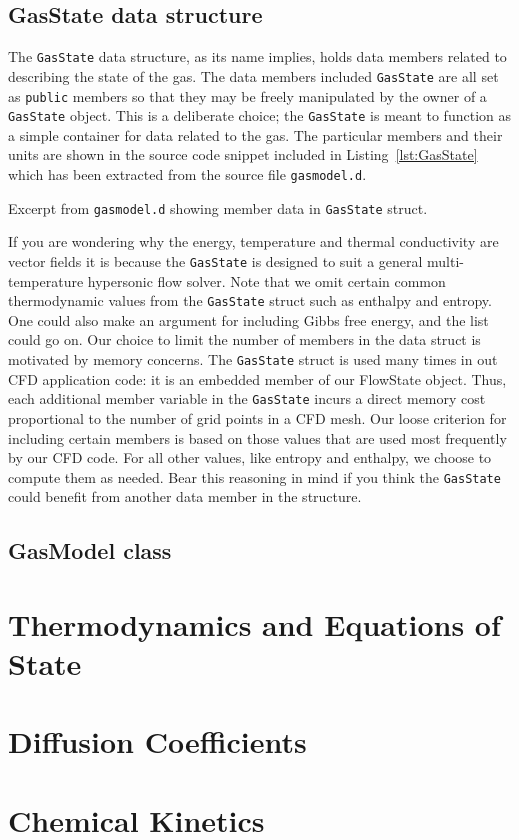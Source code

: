 \documentclass[a4paper,11pt,twoside,onecolumn]{memoir}
\newcommand{\type}[1]{\texttt{#1}}
\begin{document}
\section{GasState data structure}
\label{sec:GasState}

The \type{GasState} data structure, as its name implies,
holds data members related to describing the state of the gas.
The data members included \type{GasState} are all set as \type{public}
members so that they may be freely manipulated by the owner of a 
\type{GasState} object. This is a deliberate choice; the \type{GasState}
is meant to function as a simple container for data related to the
gas.
The particular members and their units are shown in the source code
snippet included in Listing~\ref{lst:GasState} which has been extracted
from the source file \type{gasmodel.d}.

\begin{Listing}

\caption{Excerpt from \type{gasmodel.d} showing member data in \type{GasState} struct.}
\label{lst:GasState}
\end{Listing}

If you are wondering why the energy, temperature and thermal conductivity are
vector fields it is because the \type{GasState} is designed to suit a 
general multi-temperature hypersonic flow solver.
Note that we omit certain common thermodynamic values from the \type{GasState} struct such as enthalpy and entropy.
One could also make an argument for including Gibbs free energy, and the list
could go on.
Our choice to limit the number of members in the data struct is motivated
by memory concerns.
The \type{GasState} struct is used many times in out CFD application code:
it is an embedded member of our FlowState object.
Thus, each additional member variable in the \type{GasState} incurs a direct
memory cost proportional to the number of grid points in a CFD mesh.
Our loose criterion for including certain members is based on those values
that are used most frequently by our CFD code.
For all other values, like entropy and enthalpy, we choose to compute them
as needed.
Bear this reasoning in mind if you think the \type{GasState} could benefit
from another data member in the structure.


\section{GasModel class}

\chapter{Thermodynamics and Equations of State}

\chapter{Diffusion Coefficients}

\chapter{Chemical Kinetics}
\end{document}
